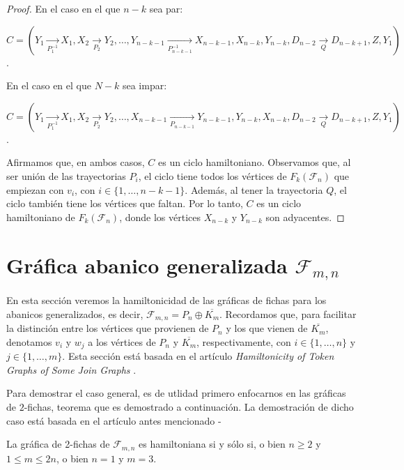 \begin{proof}
    En el caso en el que $n-k$ sea par:
            
    $C =(Y_1 \xrightarrow[P_1^{-1}]{} X_1, X_2 \xrightarrow[P_2]{} Y_2, \dots,
    Y_{n-k-1} \xrightarrow[P_{n-k-1}^{-1}]{} X_{n-k-1}, X_{n-k}, Y_{n-k},
    D_{n-2} \xrightarrow[Q]{} D_{n-k+1}, Z, Y_1)$.
    
    En el caso en el que $N-k$ sea impar:
    
    $C = (Y_1 \xrightarrow[P_1^{-1}]{} X_1, X_2 \xrightarrow[P_2]{} Y_2, \dots,
    X_{n-k-1} \xrightarrow[P_{n-k-1}]{} Y_{n-k-1}, Y_{n-k}, X_{n-k}, D_{n-2}
    \xrightarrow[Q]{} D_{n-k+1}, Z, Y_1)$.
    
    Afirmamos que, en ambos casos, $C$ es un ciclo hamiltoniano. Observamos que,
    al ser uni\'on de las trayectorias $P_i$, el ciclo tiene todos los
    v\'ertices de $F_k(\mathcal{F}_n)$ que empiezan con $v_i$, con $i \in \{1,
    \dots, n-k-1\}$. Adem\'as, al tener la trayectoria $Q$, el ciclo tambi\'en
    tiene los v\'ertices que faltan. Por lo tanto, $C$ es un ciclo hamiltoniano
    de $F_k(\mathcal{F}_n)$, donde los v\'ertices $X_{n-k}$ y $Y_{n-k}$ son
    adyacentes. 

\end{proof}

\section{Gr\'afica abanico generalizada
\texorpdfstring{$\mathcal{F}_{m,n}$}{Fmn}}%
\label{sec:GeneralFan}

En esta secci\'on veremos la hamiltonicidad de las gr\'aficas de fichas para los
abanicos generalizados, es decir, $\mathcal{F}_{m,n}=P_n \oplus \overline{K_m}$.
Recordamos que, para facilitar la distinci\'on entre los v\'ertices que
provienen de $P_n$ y los que vienen de $\overline{K_m}$, denotamos $v_i$ y $w_j$
a los v\'ertices de $P_n$ y $\overline{K_m}$, respectivamente, con $i \in \{1,
\dots, n\}$ y $j \in \{1, \dots, m\}$. Esta secci\'on est\'a basada en el
art\'iculo \textit{Hamiltonicity of Token Graphs of Some Join Graphs}
\cite{adameHamilt}.

Para demostrar el caso general, es de utlidad primero enfocarnos en las
gr\'aficas de $2$-fichas, teorema que es demostrado a continuaci\'on. La
demostraci\'on de dicho caso est\'a basada en el art\'iculo antes mencionado
\cite{adameHamilt}-

\begin{teorema}
\label{teo:2-TokGenerFan}
    La gr\'afica de 2-fichas de $\mathcal{F}_{m,n}$ es hamiltoniana si y s\'olo
    si, o bien $n \geq 2$ y $1 \leq m \leq 2n$, o  bien $n=1$ y $m=3$.
\end{teorema}

